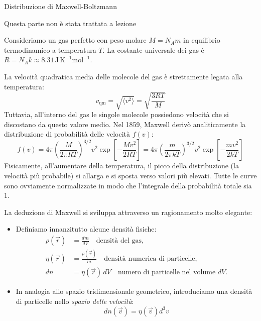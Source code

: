 \documentclass[openany,a4paper,12pt]{book}
\theoremstyle{remark}
\begin{document}
\begin{bressan}{Distribuzione di Maxwell-Boltzmann}

\begin{nota}
Questa parte non è stata trattata a lezione
\end{nota}

    Consideriamo un gas perfetto con peso molare $M = N_A m$ in equilibrio termodinamico a temperatura $T$. La costante universale dei gas è $R = N_A k \approx 8.31 \, \text{J} \, \text{K}^{-1} \text{mol}^{-1}$.

La velocità quadratica media delle molecole del gas è strettamente legata alla temperatura:
\begin{equation}
    v_{\text{qm}} = \sqrt{\langle v^2 \rangle} = \sqrt{\frac{3RT}{M}}
\end{equation}
Tuttavia, all'interno del gas le singole molecole possiedono velocità che si discostano da questo valore medio. Nel 1859, Maxwell derivò analiticamente la distribuzione di probabilità delle velocità $f(v)$:
\begin{equation}
    f(v) = 4\pi \left( \frac{M}{2\pi RT} \right)^{3/2} v^2 \exp \left[ -\frac{Mv^2}{2RT} \right] = 4\pi \left( \frac{m}{2\pi kT} \right)^{3/2} v^2 \exp \left[ -\frac{mv^2}{2kT} \right]
\end{equation}
Fisicamente, all'aumentare della temperatura, il picco della distribuzione (la velocità più probabile) si allarga e si sposta verso valori più elevati. Tutte le curve sono ovviamente normalizzate in modo che l'integrale della probabilità totale sia 1.

La deduzione di Maxwell si sviluppa attraverso un ragionamento molto elegante:
\begin{itemize}
    \item Definiamo innanzitutto alcune densità fisiche:
    \begin{align*}
        \rho(\vec{r}) &= \frac{dm}{dV} \quad \text{densità del gas}, \\[6pt]
        \eta(\vec{r}) &= \frac{\rho(\vec{r})}{m} \quad \text{densità numerica di particelle}, \\[6pt]
        dn &= \eta(\vec{r}) \, dV \quad \text{numero di particelle nel volume } dV.
    \end{align*}
    
    \item In analogia allo spazio tridimensionale geometrico, introduciamo una densità di particelle nello \textit{spazio delle velocità}: 
    \[ dn(\vec{v})=\eta (\vec{v}) d^3 v \]
    

\end{itemize}
\end{bressan}
\end{document}

